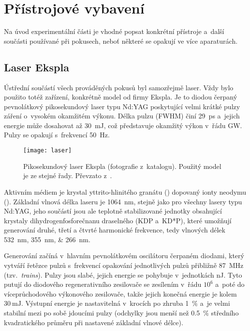 \chapter{Přístrojové vybavení}
\label{sec:instruments}
Na úvod experimentální části je vhodné popsat konkrétní přístroje
a~další součásti používané při pokusech,
neboť některé se opakují ve více aparaturách.

\section{Laser Ekspla }
\label{sec:instruments-laser}
Ústřední součástí všech prováděných pokusů byl samozřejmě laser.
Vždy bylo použito totéž zařízení, konkrétně model 
od firmy Ekspla.
Je to diodou čerpaný pevnolátkový pikosekundový laser typu Nd:YAG
poskytující velmi krátké pulzy záření o~vysokém okamžitém výkonu.
Délka pulzu (FWHM) činí \SI{29}{\pico\second}
a~jejich energie může dosahovat až \SI{30}{\milli\joule},
což představuje okamžitý výkon v~řádu \si{\giga\watt}.
Pulzy se opakují s~frekvencí \SI{50}{\hertz}.

\begin{figure}[htp]
	\centering
	\texttt{[image: laser]}
	\caption{Pikosekundový laser Ekspla (fotografie z~katalogu).
		Použitý model je ze stejné řady.
		Převzato z~\cite{ekspla-datasheet}.}
	\label{fig:instruments-laser}
\end{figure}

Aktivním médiem je krystal yttrito-hlinitého granátu ()
dopovaný ionty neodymu ().\autocite{wiki-ndyag}
Základní vlnová délka laseru je \SI{1064}{\nano\metre},
stejně jako pro všechny lasery typu Nd:YAG,
jeho součástí jsou ale teplotně stabilizované jednotky obsahující
krystaly di\-hydro\-gen\-fosfo\-rečnanu draselného (KDP a~KD*P),
které umožňují generování druhé, třetí a čtvrté harmonické frekvence,
tedy vlnových délek \SIlist{532; 355; 266}{\nano\metre}.
\autocite{ekspla-datasheet}

Generování začíná v~hlavním pevnolátkovém oscilátoru čerpaném diodami,
který vytváří řetězce pulzů s~frekvencí opakování jednotlivých pulzů
přibližně \SI{87}{\mega\hertz} (tzv.~\emph{trains}).
Pulzy jsou slabé, jejich energie se pohybuje v~jednotkách \si{\nano\joule}.
Tyto putují do diodového regenerativního zesilovače se zesílením v~řádu $10^6$
a~poté do víceprůchodového výkonového zesilovače,
takže jejich konečná energie je kolem $\SI{30}{\milli\joule}$.
Výstupní energie je nastavitelná v~krocích po zhruba \SI{1}{\percent}
a~je velmi stabilní mezi po sobě jdoucími pulzy
(odchylky jsou menší než \SI{0.5}{\percent} středního kvadratického průměru
při nastavené základní vlnové délce).
\autocite{ekspla-datasheet}

